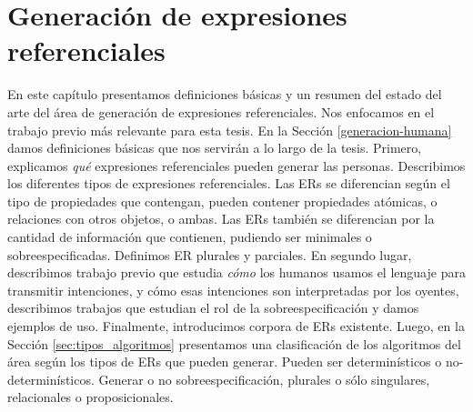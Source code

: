 \chapter{Generaci\'on de expresiones referenciales}
\label{sec:seleccion}

En este cap\'itulo presentamos definiciones b\'asicas y un resumen del estado del arte del \'area de generaci\'on de expresiones referenciales. Nos enfocamos en el trabajo previo m\'as relevante para esta tesis. 
En la Secci\'on \ref{generacion-humana} damos definiciones b\'asicas que nos servir\'an a 
lo largo de la tesis. Primero, explicamos \emph{qu\'e} expresiones referenciales pueden generar las personas. Describimos los diferentes tipos de expresiones referenciales. Las ERs se diferencian seg\'un el tipo de propiedades que 
contengan, pueden contener propiedades at\'omicas, o relaciones con otros objetos, o ambas. Las ERs tambi\'en se diferencian por la cantidad de informaci\'on que contienen, pudiendo ser minimales o sobreespecificadas. Definimos ER plurales y parciales. %
En segundo lugar, describimos trabajo previo que estudia \emph{c\'omo} los humanos usamos el lenguaje para transmitir intenciones, y c\'omo esas intenciones son interpretadas por los oyentes, describimos trabajos que estudian el rol de la sobreespecificaci\'on y damos ejemplos de uso. Finalmente, introducimos corpora de ERs existente. Luego, en la Secci\'on \ref{sec:tipos_algoritmos} presentamos una clasificaci\'on de los algoritmos del \'area seg\'un los tipos de ERs que pueden generar. Pueden ser determin\'isticos o no-determin\'isticos. Generar o no sobreespecificaci\'on, plurales o s\'olo singulares, relacionales o proposicionales.

